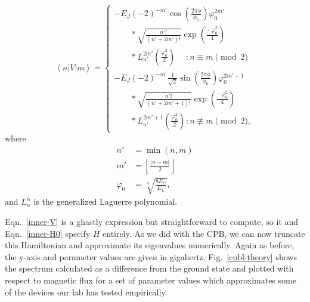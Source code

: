 \documentclass[twocolumn]{revtex4}
\newcommand{\innerp}[3]{\left< #1 | #2 | #3 \right>}
\begin{document}
\begin{equation}
  \innerp{n}{V}{m} = \left\{\begin{array}{l}
      -E_J(-2)^{-m'}\cos\left(\frac{2\pi\phi}{\phi_0}\right)\varphi_0^{2m'}\\
      \phantom{-E_J}*\sqrt{\frac{n'!}{(n'+2m')!}}
      \exp\left(\frac{-\varphi_0^2}{4}\right)\\
      \phantom{-E_J}*L_{n'}^{2m'}\left(\frac{\varphi_0^2}{2}\right)
      \phantom{{}^{{}+1}} : n \equiv m \pmod{2} \\
      -E_J(-2)^{-m'}\frac{1}{\sqrt{2}}\sin\left(\frac{2\pi\phi}{\phi_0}\right)\varphi_0^{2m'+1}\\
      \phantom{-E_J}*\sqrt{\frac{n'!}{(n'+2m'+1)!}}
      \exp\left(\frac{-\varphi_0^2}{4}\right)\\
      \phantom{-E_J}*L_{n'}^{2m'+1}\left(\frac{\varphi_0^2}{2}\right)
      \phantom{{}^{{}}} : n \not\equiv m \pmod{2},
\end{array}\right.
\label{inner-V}
\end{equation}
where
\begin{align}
  n'& =\min(n,m)\\
  m'&=\left\lfloor\frac{|n-m|}{2}\right\rfloor \\
  \varphi_0 &=\sqrt[4]{\frac{8E_C}{E_L}},
\end{align}
and $L_n^\alpha$ is the generalized Laguerre polynomial.

Eqn.~\ref{inner-V} is a ghastly expression but straightforward to
compute, so it and Eqn.~\ref{inner-H0} specify $H$ entirely. As we did
with the CPB, we can now truncate this Hamiltonian and approximate its
eigenvalues numerically. Again as before, the y-axis and parameter
values are given in gigahertz. Fig.~\ref{cpbl-theory} shows the
spectrum calculated as a difference from the ground state and plotted
with respect to magnetic flux for a set of parameter values which
approximates some of the devices our lab has tested empirically.
\end{document}
